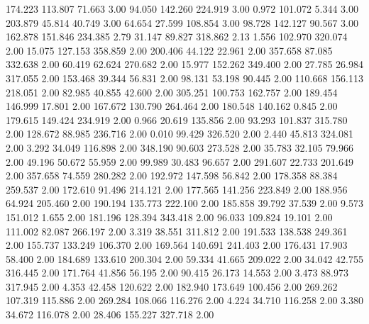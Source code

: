  174.223  113.807   71.663         3.00
  94.050  142.260  224.919         3.00
   0.972  101.072    5.344         3.00
 203.879   45.814   40.749         3.00
  64.654   27.599  108.854         3.00
  98.728  142.127   90.567         3.00
 162.878  151.846  234.385         2.79
  31.147   89.827  318.862         2.13
   1.556  102.970  320.074         2.00
  15.075  127.153  358.859         2.00
 200.406   44.122   22.961         2.00
 357.658   87.085  332.638         2.00
  60.419   62.624  270.682         2.00
  15.977  152.262  349.400         2.00
  27.785   26.984  317.055         2.00
 153.468   39.344   56.831         2.00
  98.131   53.198   90.445         2.00
 110.668  156.113  218.051         2.00
  82.985   40.855   42.600         2.00
 305.251  100.753  162.757         2.00
 189.454  146.999   17.801         2.00
 167.672  130.790  264.464         2.00
 180.548  140.162    0.845         2.00
 179.615  149.424  234.919         2.00
   0.966   20.619  135.856         2.00
  93.293  101.837  315.780         2.00
 128.672   88.985  236.716         2.00
   0.010   99.429  326.520         2.00
   2.440   45.813  324.081         2.00
   3.292   34.049  116.898         2.00
 348.190   90.603  273.528         2.00
  35.783   32.105   79.966         2.00
  49.196   50.672   55.959         2.00
  99.989   30.483   96.657         2.00
 291.607   22.733  201.649         2.00
 357.658   74.559  280.282         2.00
 192.972  147.598   56.842         2.00
 178.358   88.384  259.537         2.00
 172.610   91.496  214.121         2.00
 177.565  141.256  223.849         2.00
 188.956   64.924  205.460         2.00
 190.194  135.773  222.100         2.00
 185.858   39.792   37.539         2.00
   9.573  151.012    1.655         2.00
 181.196  128.394  343.418         2.00
  96.033  109.824   19.101         2.00
 111.002   82.087  266.197         2.00
   3.319   38.551  311.812         2.00
 191.533  138.538  249.361         2.00
 155.737  133.249  106.370         2.00
 169.564  140.691  241.403         2.00
 176.431   17.903   58.400         2.00
 184.689  133.610  200.304         2.00
  59.334   41.665  209.022         2.00
  34.042   42.755  316.445         2.00
 171.764   41.856   56.195         2.00
  90.415   26.173   14.553         2.00
   3.473   88.973  317.945         2.00
   4.353   42.458  120.622         2.00
 182.940  173.649  100.456         2.00
 269.262  107.319  115.886         2.00
 269.284  108.066  116.276         2.00
   4.224   34.710  116.258         2.00
   3.380   34.672  116.078         2.00
  28.406  155.227  327.718         2.00
